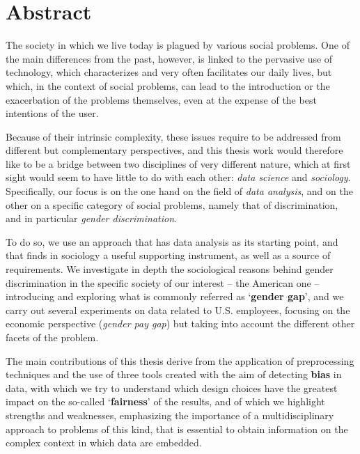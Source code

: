 
\newpage
\chapter*{Abstract}


The society in which we live today is plagued by various social problems. One of the main differences from the past, however, is linked to the pervasive use of technology, which characterizes and very often facilitates our daily lives, but which, in the context of social problems, can lead to the introduction or the exacerbation of the problems themselves, even at the expense of the best intentions of the user.

Because of their intrinsic complexity, these issues require to be addressed from different but complementary perspectives, and this thesis work would therefore like to be a bridge between two disciplines of very different nature, which at first sight would seem to have little to do with each other: \textit{data science} and \textit{sociology}. Specifically, our focus is on the one hand on the field of \textit{data analysis}, and on the other on a specific category of social problems, namely that of discrimination, and in particular \textit{gender discrimination}.

To do so, we use an approach that has data analysis as its starting point, and that finds in sociology a useful supporting instrument, as well as a source of requirements. We investigate in depth the sociological reasons behind gender discrimination in the specific society of our interest -- the American one -- introducing and exploring what is commonly referred as `\textbf{gender gap}', and we carry out several experiments on data related to U.S. employees, focusing on the economic perspective (\textit{gender pay gap}) but taking into account the different other facets of the problem.

The main contributions of this thesis derive from the application of preprocessing techniques and the use of three tools created with the aim of detecting \textbf{bias} in data, with which we try to understand which design choices have the greatest impact on the so-called `\textbf{fairness}' of the results, and of which we highlight strengths and weaknesses, emphasizing the importance of a multidisciplinary approach to problems of this kind, that is essential to obtain information on the complex context in which data are embedded.


